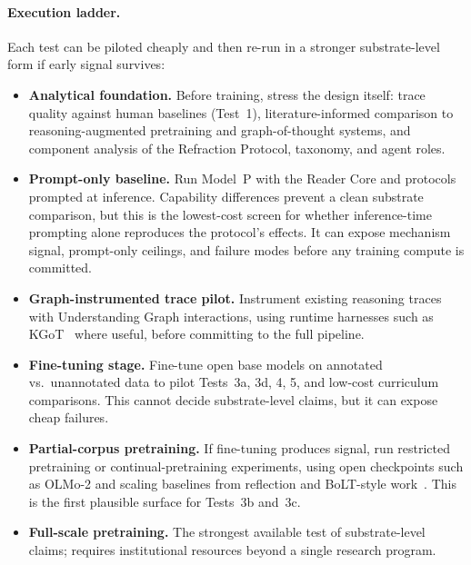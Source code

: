\paragraph{Execution ladder.} Each test can be piloted cheaply and then
re-run in a stronger substrate-level form if early signal survives:
\begin{itemize}
    \item \textbf{Analytical foundation.} Before training, stress the design
    itself: trace quality against human baselines (Test~1), literature-informed
    comparison to reasoning-augmented pretraining and graph-of-thought systems,
    and component analysis of the Refraction Protocol, taxonomy, and agent
    roles.
    \item \textbf{Prompt-only baseline.} Run Model~P with the Reader Core and
    protocols prompted at inference. Capability differences prevent a clean
    substrate comparison, but this is the lowest-cost screen for whether
    inference-time prompting alone reproduces the protocol's effects. It can
    expose mechanism signal, prompt-only ceilings, and failure modes before any
    training compute is committed.
    \item \textbf{Graph-instrumented trace pilot.} Instrument existing
    reasoning traces with Understanding Graph interactions, using runtime
    harnesses such as KGoT~\cite{besta2025kgot} where useful, before committing
    to the full pipeline.
    \item \textbf{Fine-tuning stage.} Fine-tune open base models on annotated
    vs.\ unannotated data to pilot Tests~3a, 3d, 4, 5, and low-cost curriculum
    comparisons. This cannot decide substrate-level claims, but it can expose
    cheap failures.
    \item \textbf{Partial-corpus pretraining.} If fine-tuning produces signal,
    run restricted pretraining or continual-pretraining experiments, using
    open checkpoints such as OLMo-2 and scaling baselines from reflection and
    BoLT-style work~\cite{rethinkingreflection2025,ruan2025bolt}. This is the
    first plausible surface for Tests~3b and~3c.
    \item \textbf{Full-scale pretraining.} The strongest available test of substrate-level claims; requires institutional resources beyond a single research program.
\end{itemize}

